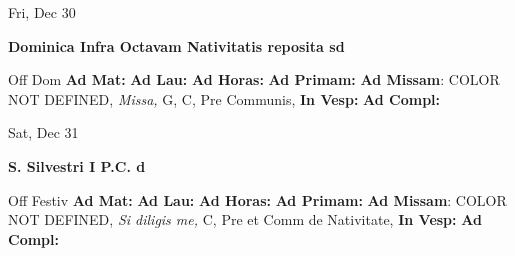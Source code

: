 \documentclass[10pt]{memoir}
\begin{document}
\begin{center}
\begin{minipage}{3.5in}
\vspace{2em}
\begin{center}Fri, Dec 30
\end{center}
\textbf{ \large Dominica Infra Octavam Nativitatis reposita
\textnormal{\normalsize sd}}

\begin{justify}Off Dom
\textbf{Ad Mat: }
\textbf{Ad Lau: }
\textbf{Ad Horas: }
\textbf{Ad Primam: }\textbf{Ad Missam}: COLOR NOT DEFINED, \textit{Missa,} G, C, Pre Communis, 
\textbf{In Vesp: }
\textbf{Ad Compl: }
\end{justify}
\end{minipage}
\end{center}

\begin{center}
\begin{minipage}{3.5in}
\vspace{2em}
\begin{center}Sat, Dec 31
\end{center}
\textbf{ \large S. Silvestri I P.C.
\textnormal{\normalsize d}}

\begin{justify}Off Festiv
\textbf{Ad Mat: }
\textbf{Ad Lau: }
\textbf{Ad Horas: }
\textbf{Ad Primam: }\textbf{Ad Missam}: COLOR NOT DEFINED, \textit{Si diligis me,} C, Pre et Comm de Nativitate, 
\textbf{In Vesp: }
\textbf{Ad Compl: }
\end{justify}
\end{minipage}
\end{center}
\end{document}
